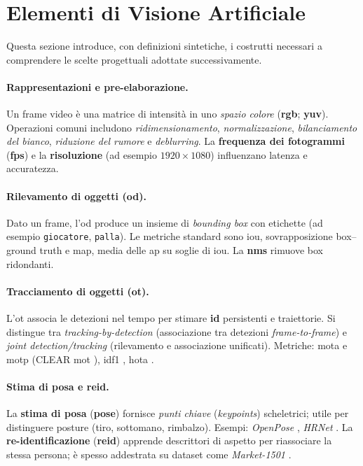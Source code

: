 \documentclass[12pt,a4paper,openright,twoside]{book}
\begin{document}
\section{Elementi di Visione Artificiale}
\label{sec:elementi-visione-artificiale}

Questa sezione introduce, con definizioni sintetiche, i costrutti necessari a comprendere le scelte progettuali 
adottate successivamente.

\paragraph{Rappresentazioni e pre-elaborazione.} Un frame video è una matrice di intensità in uno \emph{spazio colore} 
(\textbf{\ac{rgb}}; \textbf{\ac{yuv}}).
Operazioni comuni includono \emph{ridimensionamento}, \emph{normalizzazione}, \emph{bilanciamento del bianco},
\emph{riduzione del rumore} e \emph{deblurring}.
La \textbf{frequenza dei fotogrammi} (\textbf{\ac{fps}}) e la \textbf{risoluzione} 
(ad esempio $1920\times1080$) influenzano latenza e accuratezza.

\paragraph{Rilevamento di oggetti (\ac{od}).} Dato un frame, l'\ac{od} produce un insieme di \emph{bounding box} con etichette 
(ad esempio \texttt{giocatore}, \texttt{palla}). Le metriche standard sono \ac{iou},
sovrapposizione box--ground truth e \ac{map}, media delle \ac{ap} su soglie di \ac{iou}.
La \textbf{\ac{nms}} rimuove box ridondanti.

\paragraph{Tracciamento di oggetti (\ac{ot}).} L'\ac{ot} associa le detezioni nel tempo per stimare \textbf{\ac{id}} persistenti 
e traiettorie. Si distingue tra \emph{\textit{tracking-by-detection}} (associazione tra detezioni \emph{frame-to-frame}) e 
\emph{\textit{joint detection/tracking}} (rilevamento e associazione unificati). Metriche: \ac{mota} e \ac{motp}
(CLEAR \ac{mot} \cite{bernardin2008evaluating}), \ac{idf1} \cite{ristani2016performance}, \ac{hota} \cite{luiten2021hota}.

\paragraph{Stima di posa e \ac{reid}.} La \textbf{stima di posa} (\textbf{pose}) fornisce \emph{punti chiave} (\textit{keypoints}) scheletrici;
utile per distinguere posture (tiro, sottomano, rimbalzo). Esempi: \textit{OpenPose} \cite{cao2017realtime}, \textit{HRNet} \cite{sun2019deep}.
La \textbf{re-identificazione} (\textbf{\ac{reid}}) apprende descrittori di aspetto per riassociare la stessa persona;
è spesso addestrata su dataset come \textit{Market-1501} \cite{zheng2015scalable}.
\end{document}
